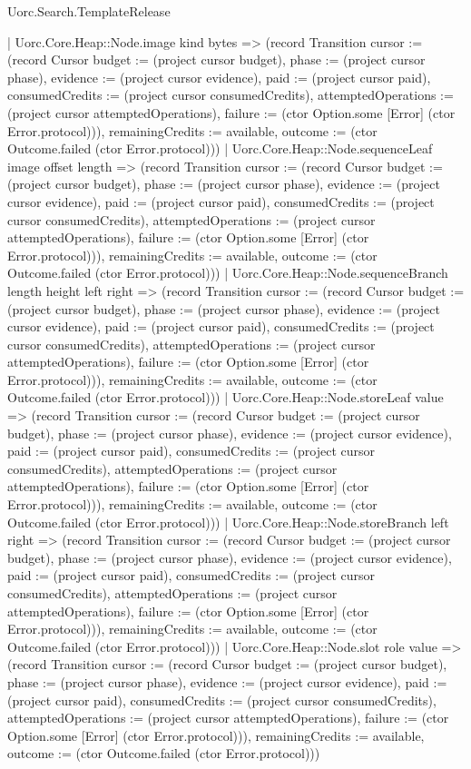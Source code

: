 \begin{lexlean}{Uorc.Search.TemplateRelease}
\begin{semanticmodule}
{      | Uorc.Core.Heap::Node.image kind bytes => (record Transition {cursor := (record Cursor {budget := (project cursor budget), phase := (project cursor phase), evidence := (project cursor evidence), paid := (project cursor paid), consumedCredits := (project cursor consumedCredits), attemptedOperations := (project cursor attemptedOperations), failure := (ctor Option.some [Error] (ctor Error.protocol))}), remainingCredits := available, outcome := (ctor Outcome.failed (ctor Error.protocol))})
      | Uorc.Core.Heap::Node.sequenceLeaf image offset length => (record Transition {cursor := (record Cursor {budget := (project cursor budget), phase := (project cursor phase), evidence := (project cursor evidence), paid := (project cursor paid), consumedCredits := (project cursor consumedCredits), attemptedOperations := (project cursor attemptedOperations), failure := (ctor Option.some [Error] (ctor Error.protocol))}), remainingCredits := available, outcome := (ctor Outcome.failed (ctor Error.protocol))})
      | Uorc.Core.Heap::Node.sequenceBranch length height left right => (record Transition {cursor := (record Cursor {budget := (project cursor budget), phase := (project cursor phase), evidence := (project cursor evidence), paid := (project cursor paid), consumedCredits := (project cursor consumedCredits), attemptedOperations := (project cursor attemptedOperations), failure := (ctor Option.some [Error] (ctor Error.protocol))}), remainingCredits := available, outcome := (ctor Outcome.failed (ctor Error.protocol))})
      | Uorc.Core.Heap::Node.storeLeaf value => (record Transition {cursor := (record Cursor {budget := (project cursor budget), phase := (project cursor phase), evidence := (project cursor evidence), paid := (project cursor paid), consumedCredits := (project cursor consumedCredits), attemptedOperations := (project cursor attemptedOperations), failure := (ctor Option.some [Error] (ctor Error.protocol))}), remainingCredits := available, outcome := (ctor Outcome.failed (ctor Error.protocol))})
      | Uorc.Core.Heap::Node.storeBranch left right => (record Transition {cursor := (record Cursor {budget := (project cursor budget), phase := (project cursor phase), evidence := (project cursor evidence), paid := (project cursor paid), consumedCredits := (project cursor consumedCredits), attemptedOperations := (project cursor attemptedOperations), failure := (ctor Option.some [Error] (ctor Error.protocol))}), remainingCredits := available, outcome := (ctor Outcome.failed (ctor Error.protocol))})
      | Uorc.Core.Heap::Node.slot role value => (record Transition {cursor := (record Cursor {budget := (project cursor budget), phase := (project cursor phase), evidence := (project cursor evidence), paid := (project cursor paid), consumedCredits := (project cursor consumedCredits), attemptedOperations := (project cursor attemptedOperations), failure := (ctor Option.some [Error] (ctor Error.protocol))}), remainingCredits := available, outcome := (ctor Outcome.failed (ctor Error.protocol))})
}
\end{semanticmodule}
\end{lexlean}
